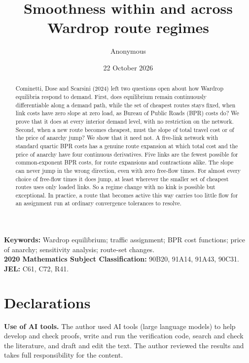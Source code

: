 \documentclass[11pt,a4paper]{article}
\title{Smoothness within and across\\Wardrop route regimes}
\author{Anonymous}
\date{22 October 2026}
\theoremstyle{definition}
\theoremstyle{remark}
\begin{document}
\maketitle
\vspace{-1.5em}
\begin{abstract}
Cominetti, Dose and Scarsini (2024) left two questions open about how Wardrop equilibria respond to demand. First, does equilibrium remain continuously differentiable along a demand path, while the set of cheapest routes stays fixed, when link costs have zero slope at zero load, as Bureau of Public Roads (BPR) costs do? We prove that it does at every interior demand level, with no restriction on the network. Second, when a new route becomes cheapest, must the slope of total travel cost or of the price of anarchy jump? We show that it need not. A five-link network with standard quartic BPR costs has a genuine route expansion at which total cost and the price of anarchy have four continuous derivatives. Five links are the fewest possible for common-exponent BPR costs, for route expansions and contractions alike. The slope can never jump in the wrong direction, even with zero free-flow times. For almost every choice of free-flow times it does jump, at least wherever the smaller set of cheapest routes uses only loaded links. So a regime change with no kink is possible but exceptional. In practice, a route that becomes active this way carries too little flow for an assignment run at ordinary convergence tolerances to resolve.
\end{abstract}
\noindent\textbf{Keywords:} Wardrop equilibrium; traffic assignment; BPR cost functions; price of anarchy; sensitivity analysis; route-set changes.\\
\textbf{2020 Mathematics Subject Classification:} 90B20, 91A14, 91A43, 90C31.\quad
\textbf{JEL:} C61, C72, R41.











\section*{Declarations}
\textbf{Use of AI tools.} The author used AI tools (large language models) to help develop and check proofs, write and run the verification code, search and check the literature, and draft and edit the text. The author reviewed the results and takes full responsibility for the content.
\end{document}
